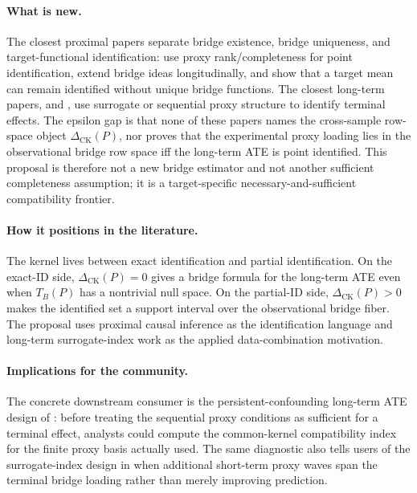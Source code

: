 \documentclass[11pt]{article}
\theoremstyle{definition}
\theoremstyle{plain}
\theoremstyle{remark}
\begin{document}
\paragraph{What is new.}
The closest proximal papers separate bridge existence, bridge uniqueness, and
target-functional identification: \citet{MiaoGengTchetgen2018} use proxy
rank/completeness for point identification, \citet{YingMiaoShiTchetgen2023}
extend bridge ideas longitudinally, and \citet{ZhangLiMiaoTchetgen2023} show
that a target mean can remain identified without unique bridge functions.  The
closest long-term papers, \citet{AtheyChettyImbensKang2019} and
\citet{ImbensKallusMaoWang2025}, use surrogate or sequential proxy structure
to identify terminal effects.  The epsilon gap is that none of these papers
names the cross-sample row-space object \(\Delta_{\mathrm{CK}}(P)\), nor proves
that the experimental proxy loading lies in the observational bridge row space
iff the long-term ATE is point identified.  This proposal is therefore not a
new bridge estimator and not another sufficient completeness assumption; it is
a target-specific necessary-and-sufficient compatibility frontier.

\paragraph{How it positions in the literature.}
The kernel lives between exact identification and partial identification.  On
the exact-ID side, \(\Delta_{\mathrm{CK}}(P)=0\) gives a bridge formula for the
long-term ATE even when \(T_B(P)\) has a nontrivial null space.  On the
partial-ID side, \(\Delta_{\mathrm{CK}}(P)>0\) makes the identified set a
support interval over the observational bridge fiber.  The proposal uses
proximal causal inference as the identification language and long-term
surrogate-index work as the applied data-combination motivation.

\paragraph{Implications for the community.}
The concrete downstream consumer is the persistent-confounding long-term ATE
design of \citet{ImbensKallusMaoWang2025}: before treating the sequential proxy
conditions as sufficient for a terminal effect, analysts could compute the
common-kernel compatibility index for the finite proxy basis actually used.
The same diagnostic also tells users of the surrogate-index design in
\citet{AtheyChettyImbensKang2019} when additional short-term proxy waves span
the terminal bridge loading rather than merely improving prediction.
\end{document}
